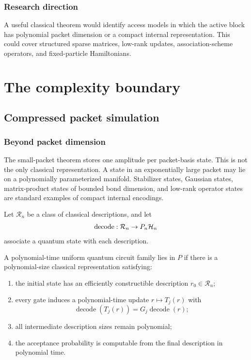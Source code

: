 \subsection{Research direction}
A useful classical theorem would identify access models in which the active block has polynomial packet dimension or a compact internal representation. This could cover structured sparse matrices, low-rank updates, association-scheme operators, and fixed-particle Hamiltonians.

\chapter{The complexity boundary}
\section{Compressed packet simulation}
\label{s:ch:compressed-packets}

\subsection{Beyond packet dimension}
The small-packet theorem stores one amplitude per packet-basis state. This is not the only classical representation. A state in an exponentially large packet may lie on a polynomially parameterized manifold. Stabilizer states, Gaussian states, matrix-product states of bounded bond dimension, and low-rank operator states are standard examples of compact internal encodings.

Let $\mathcal R_n$ be a class of classical descriptions, and let
\[
\operatorname{decode}:\mathcal R_n\to P_n\mathcal H_n
\]
associate a quantum state with each description.

\begin{theorem}
\label{s:thm:compressed-packet}
A polynomial-time uniform quantum circuit family lies in $P$ if there is a polynomial-size classical representation satisfying:

\begin{enumerate}
\item the initial state has an efficiently constructible description $r_0\in\mathcal R_n$;
\item every gate induces a polynomial-time update $r\mapsto T_j(r)$ with
\[
\operatorname{decode}(T_j(r))
=
G_j\operatorname{decode}(r);
\]
\item all intermediate description sizes remain polynomial;
\item the acceptance probability is computable from the final description in polynomial time.
\end{enumerate}
\end{theorem}

